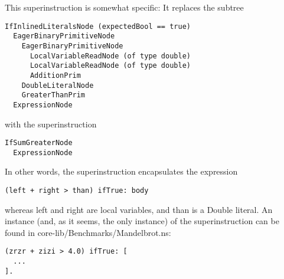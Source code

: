 \documentclass[10pt,a4paper]{article}
\begin{document}
This superinstruction is somewhat specific: It replaces the subtree
\begin{verbatim}
IfInlinedLiteralsNode (expectedBool == true)
  EagerBinaryPrimitiveNode
    EagerBinaryPrimitiveNode
      LocalVariableReadNode (of type double)
      LocalVariableReadNode (of type double)
      AdditionPrim
    DoubleLiteralNode
    GreaterThanPrim
  ExpressionNode
\end{verbatim}
with the superinstruction
\begin{verbatim}
IfSumGreaterNode
  ExpressionNode
\end{verbatim}
In other words, the superinstruction encapsulates the expression
\begin{verbatim}
(left + right > than) ifTrue: body
\end{verbatim}
whereas \textsf{left} and \textsf{right} are local variables, and \textsf{than} is a Double literal. An instance (and, as it seems, the only instance) of the superinstruction can be found in \textsf{core-lib/Benchmarks/Mandelbrot.ns}:
\begin{verbatim}
(zrzr + zizi > 4.0) ifTrue: [
  ...
].
\end{verbatim}
\end{document}
